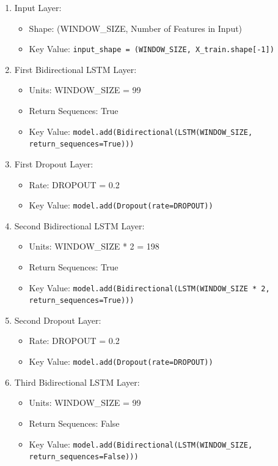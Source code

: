 \begin{enumerate}
    \item {Input Layer}:
    \begin{itemize}
        \item Shape: (WINDOW\_SIZE, Number of Features in Input)
        \item Key Value: \texttt{input\_shape = (WINDOW\_SIZE, X\_train.shape[-1])}
    \end{itemize}

    \item {First Bidirectional LSTM Layer}:
    \begin{itemize}
        \item Units: WINDOW\_SIZE = 99
        \item Return Sequences: True
        \item Key Value: \texttt{model.add(Bidirectional(LSTM(WINDOW\_SIZE, return\_sequences=True)))}
    \end{itemize}

    \item {First Dropout Layer}:
    \begin{itemize}
        \item Rate: DROPOUT = 0.2
        \item Key Value: \texttt{model.add(Dropout(rate=DROPOUT))}
    \end{itemize}

    \item {Second Bidirectional LSTM Layer}:
    \begin{itemize}
        \item Units: WINDOW\_SIZE * 2 = 198
        \item Return Sequences: True
        \item Key Value: \texttt{model.add(Bidirectional(LSTM(WINDOW\_SIZE * 2, return\_sequences=True)))}
    \end{itemize}

    \item {Second Dropout Layer}:
    \begin{itemize}
        \item Rate: DROPOUT = 0.2
        \item Key Value: \texttt{model.add(Dropout(rate=DROPOUT))}
    \end{itemize}

    \item {Third Bidirectional LSTM Layer}:
    \begin{itemize}
        \item Units: WINDOW\_SIZE = 99
        \item Return Sequences: False
        \item Key Value: \texttt{model.add(Bidirectional(LSTM(WINDOW\_SIZE, return\_sequences=False)))}
    \end{itemize}


\end{enumerate}

